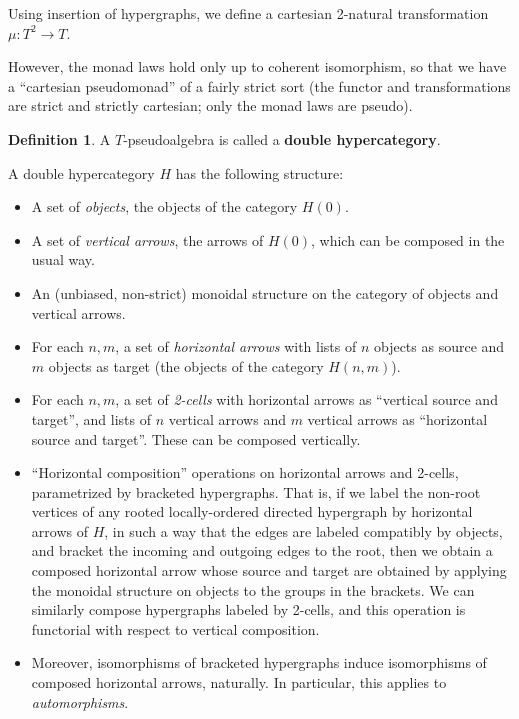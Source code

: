 \documentclass{article}
\theoremstyle{definition}
\newtheorem{defn}[thm]{Definition}
\theoremstyle{remark}
\begin{document}
Using insertion of hypergraphs, we define a cartesian 2-natural transformation $\mu:T^2\to T$.

However, the monad laws hold only up to coherent isomorphism, so that we have a ``cartesian pseudomonad'' of a fairly strict sort (the functor and transformations are strict and strictly cartesian; only the monad laws are pseudo).

\begin{defn}
  A $T$-pseudoalgebra is called a \textbf{double hypercategory}.
\end{defn}

A double hypercategory $H$ has the following structure:
\begin{itemize}
\item A set of \emph{objects}, the objects of the category $H(0)$.
\item A set of \emph{vertical arrows}, the arrows of $H(0)$, which can be composed in the usual way.
\item An (unbiased, non-strict) monoidal structure on the category of objects and vertical arrows.
\item For each $n,m$, a set of \emph{horizontal arrows} with lists of $n$ objects as source and $m$ objects as target (the objects of the category $H(n,m)$).
\item For each $n,m$, a set of \emph{2-cells} with horizontal arrows as ``vertical source and target'', and lists of $n$ vertical arrows and $m$ vertical arrows as ``horizontal source and target''.
  These can be composed vertically.
\item ``Horizontal composition'' operations on horizontal arrows and 2-cells, parametrized by bracketed hypergraphs.
  That is, if we label the non-root vertices of any rooted locally-ordered directed hypergraph by horizontal arrows of $H$, in such a way that the edges are labeled compatibly by objects, and bracket the incoming and outgoing edges to the root, then we obtain a composed horizontal arrow whose source and target are obtained by applying the monoidal structure on objects to the groups in the brackets.
  We can similarly compose hypergraphs labeled by 2-cells, and this operation is functorial with respect to vertical composition.
\item Moreover, isomorphisms of bracketed hypergraphs induce isomorphisms of composed horizontal arrows, naturally.
  In particular, this applies to \emph{automorphisms}.
\end{itemize}
\end{document}
